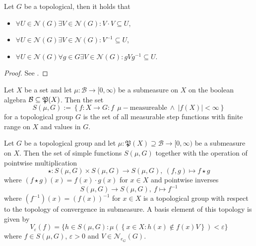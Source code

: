 \begin{lemma}
  Let $G$ be a topological, then it holds that
  \vspace*{-7px}
  \begin{itemize}
    \item $\forall U\in \mathcal{N}(G)\exists V\in\mathcal{N}(G)\colon V\cdot V \subseteq U$,
  \vspace*{-7px}
    \item $\forall U\in \mathcal{N}(G)\exists V\in\mathcal{N}(G)\colon V^{-1} \subseteq U$,
  \vspace*{-7px}
    \item $\forall U\in \mathcal{N}(G)\forall g\in G\exists V\in\mathcal{N}(G)\colon gVg^{-1} \subseteq U$.
  \end{itemize}
\end{lemma}

\begin{proof}
  See \cite[Satz 16.16]{BvQMT}.
\end{proof}

\begin{defin}\label{defin:sf}
  Let $X$ be a set and let $\mu\colon \mathcal{B} \to [0, \infty)$ be a submeasure on $X$ on the boolean algebra $\mathcal{B} \subseteq \mathfrak{P}(X)$. Then the set
  \begin{equation*}
    S(\mu, G) := \left\{ f: X \to G\colon f \:\:\mu-\text{measureable} \: \land \: \left| f(X) \right| < \infty \right\}
  \end{equation*}
  for a topological group $G$ is the set of all measurable step functions with finite range on $X$ and values in $G$.
\end{defin}

\begin{thm}\label{thm:stop}
  Let $G$ be a topological group and let $\mu\colon \mathfrak{P}(X) \supseteq \mathcal{B} \to [0,\infty)$ be a submeasure on $X$. Then the set of simple functions $S(\mu, G)$ together with the operation of pointwise multiplication \[\star: S(\mu, G) \times S(\mu, G) \to S(\mu, G), \: (f, g) \mapsto f\star g\] where $(f\star g)(x) = f(x) \cdot g(x)$ for $x \in X$ and pointwise inverses \[S(\mu, G) \to S(\mu, G), \: f \mapsto f^{-1}\] where $(f^{-1})(x) = (f(x))^{-1}$ for $x \in X$ is a topological group with respect to the topology of convergence in submeasure. A basis element of this topology is given by \[V_\varepsilon(f) = \{h\in S(\mu, G)\colon \mu(\left\{x\in X\colon h(x)\notin f(x)V \right\}) < \varepsilon\} \] where $f\in S(\mu, G)$, $\varepsilon > 0$ and $V \in \mathcal{N}_{e_G}(G)$.
\end{thm}

